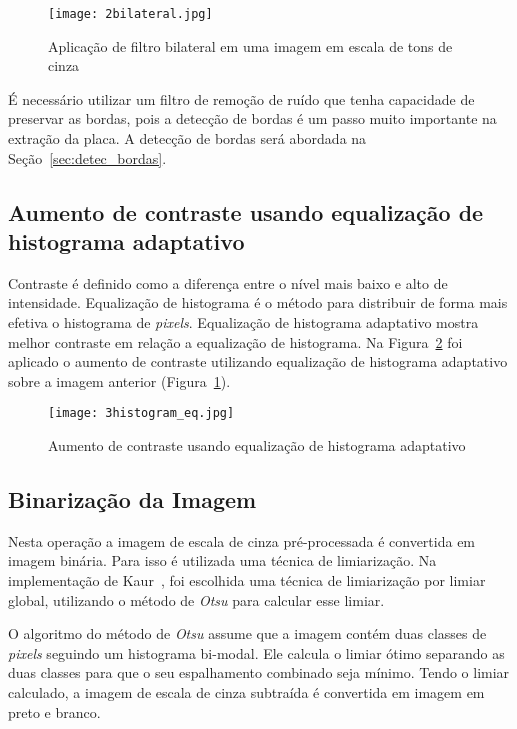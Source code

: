\begin{figure}[H]
	\centering
	\texttt{[image: 2bilateral.jpg]}
	\caption{Aplicação de filtro bilateral em uma imagem em escala de tons de cinza}
	\label{fig:ext_filter_in_gray_scale}
\end{figure}

É necessário utilizar um filtro de remoção de ruído que tenha capacidade de preservar as bordas, pois a detecção de bordas é um passo muito importante na extração da placa. A detecção de bordas será abordada na Seção~\ref{sec:detec_bordas}. 

\subsection{Aumento de contraste usando equalização de histograma adaptativo}

Contraste é definido como a diferença entre o nível mais baixo e alto de
intensidade. Equalização de histograma é o método para distribuir de forma mais efetiva o histograma de \emph{pixels}. Equalização de histograma adaptativo mostra melhor contraste em relação a equalização de histograma. Na Figura~\ref{fig:ext_contrast_adaptive_histogram} foi aplicado o aumento de contraste utilizando equalização de histograma adaptativo sobre a imagem anterior (Figura~\ref{fig:ext_filter_in_gray_scale}).

\begin{figure}[H]
	\centering
	\texttt{[image: 3histogram\_eq.jpg]}
	\caption{Aumento de contraste usando equalização de histograma adaptativo}
	\label{fig:ext_contrast_adaptive_histogram}
\end{figure}

\subsection{Binarização da Imagem}

Nesta operação a imagem de escala de cinza pré-processada é convertida em imagem binária. Para isso é utilizada uma técnica de limiarização. Na implementação de Kaur~\cite{kaur2014efficient}, foi escolhida uma técnica de limiarização por limiar global, utilizando o método de \emph{Otsu} para calcular esse limiar. 

O algoritmo do método de \emph{Otsu} assume que  a imagem contém duas classes de \emph{pixels} seguindo um histograma bi-modal. Ele calcula o limiar ótimo separando as duas classes para que o seu espalhamento combinado seja mínimo. Tendo o limiar calculado, a imagem de escala de cinza subtraída é convertida em imagem em preto e branco.

